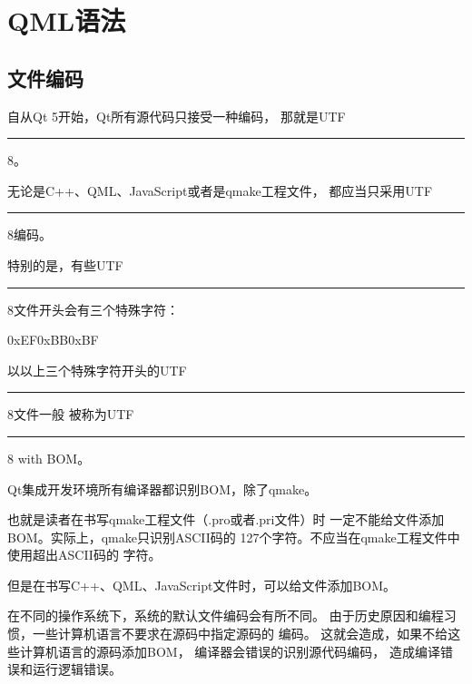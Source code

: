 ﻿




\FloatBarrier
\section{
QML语法
}\label{c000011s000000}


\FloatBarrier
\subsection{
文件编码
}\label{c000011s000000s03}


自从Qt 5开始，Qt所有源代码只接受一种编码，
那就是UTF\hspace{0.05em}\rule[0.7ex]{0.4em}{0.65pt}\hspace{0.05em}8。

无论是C{\sourcefonttwo{}+}{\sourcefonttwo{}+}、QML、JavaScript或者是qmake工程文件，
都应当只采用UTF\hspace{0.05em}\rule[0.7ex]{0.4em}{0.65pt}\hspace{0.05em}8编码。

特别的是，有些UTF\hspace{0.05em}\rule[0.7ex]{0.4em}{0.65pt}\hspace{0.05em}8文件开头会有三个特殊字符：
\begin{littlelongworld}0xEF0xBB0xBF
\end{littlelongworld}以以上三个特殊字符开头的UTF\hspace{0.05em}\rule[0.7ex]{0.4em}{0.65pt}\hspace{0.05em}8文件一般
被称为UTF\hspace{0.05em}\rule[0.7ex]{0.4em}{0.65pt}\hspace{0.05em}8 with BOM。

Qt集成开发环境所有编译器都识别BOM，除了qmake。

也就是读者在书写qmake工程文件（\raisebox{-0.35ex}{\sourcefonttwo{}*}.pro或者\raisebox{-0.35ex}{\sourcefonttwo{}*}.pri文件）时
一定不能给文件添加BOM。实际上，qmake只识别ASCII码的
127个字符。不应当在qmake工程文件中使用超出ASCII码的
字符。

但是在书写C{\sourcefonttwo{}+}{\sourcefonttwo{}+}、QML、JavaScript文件时，可以给文件添加BOM。

在不同的操作系统下，系统的默认文件编码会有所不同。
由于历史原因和编程习惯，一些计算机语言不要求在源码中指定源码的
编码。
这就会造成，如果不给这些计算机语言的源码添加BOM，
编译器会错误的识别源代码编码，
造成编译错误和运行逻辑错误。

